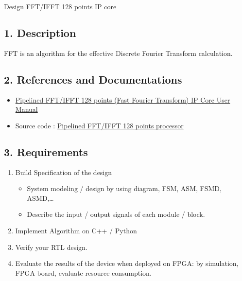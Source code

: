 \documentclass{vhdl-assignment}
\begin{document}
\pagebreak
\begin{project}{Design FFT/IFFT 128 points IP core}
    \subsection*{1. Description}
    FFT is an algorithm for the effective Discrete Fourier Transform calculation.
    \subsection*{2. References and Documentations}
    \begin{itemize}
        \item \href{https://github.com/freecores/pipelined_fft_128/blob/master/DOC/fft128_um.pdf}{Pipelined FFT/IFFT 128 points (Fast Fourier Transform) IP Core User Manual}
        \item Source code : \href{https://github.com/freecores/pipelined_fft_128}{Pipelined FFT/IFFT 128 points processor}
    \end{itemize}
    \subsection*{3. Requirements}
    \begin{enumerate}
        \item Build Specification of the design
        \begin{itemize}
            \item System modeling / design by using diagram, FSM, ASM, FSMD, ASMD,\dots
            \item Describe the input / output signals of each module / block.
        \end{itemize}
        \item Implement Algorithm on C++ / Python
        \item Verify your RTL design.
        \item Evaluate the results of the device when deployed on FPGA: by simulation, FPGA board, evaluate resource consumption.
    \end{enumerate}
\end{project}
\end{document}
